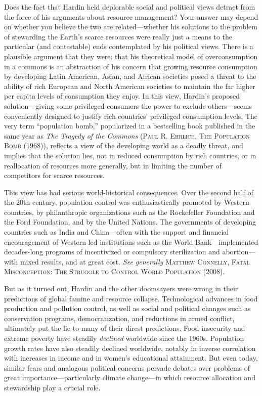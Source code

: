 Does the fact that Hardin held deplorable social and political views detract
from the force of his arguments about resource management? Your answer may
depend on whether you believe the two are related---whether his solutions to the
problem of stewarding the Earth's scarce resources were really just a means to
the particular (and contestable) ends contemplated by his political views. There
is a plausible argument that they were: that his theoretical model of
overconsumption in a commons is an abstraction of his concern that growing
resource consumption by developing Latin American, Asian, and African societies
posed a threat to the ability of rich European and North American societies to
maintain the far higher per capita levels of consumption they enjoy. In this
view, Hardin's proposed solution---giving some privileged consumers the power to
exclude others---seems conveniently designed to justify rich countries'
privileged consumption levels. The very term ``population bomb,'' popularized in
a bestselling book published in the same year as \textit{The Tragedy of the
Commons} (\textsc{Paul R. Ehrlich, The Population Bomb} (1968)), reflects a view
of the developing world as a deadly threat, and implies that the solution lies,
not in reduced consumption by rich countries, or in reallocation of resources
more generally, but in limiting the number of competitors for scarce resources. 

This view has had serious world-historical consequences. Over the second half of
the 20th century, population control was enthusiastically promoted by Western
countries, by philanthropic organizations such as the Rockefeller Foundation and
the Ford Foundation, and by the United Nations. The governments of developing
countries such as India and China---often with the support and financial
encouragement of Western-led institutions such as the World Bank---implemented
decades-long programs of incentivized or compulsory sterilization and
abortion---with mixed results, and at great cost. \textit{See generally}
\textsc{Matthew Connelly, Fatal Misconception: The Struggle to Control World
Population} (2008).

But as it turned out, Hardin and the other doomsayers were wrong in their
predictions of global famine and resource collapse. Technological advances in
food production and pollution control, as well as social and political changes
such as conservation programs, democratization, and reductions in armed
conflict, ultimately put the lie to many of their direst predictions. Food
insecurity and extreme poverty have steadily \textit{declined} worldwide since
the 1960s. Population growth rates have also steadily declined worldwide,
notably in inverse correlation with increases in income and in women's
educational attainment. But even today, similar fears and analogous political
concerns pervade debates over problems of great importance---particularly
climate change---in which resource allocation and stewardship play a crucial
role.



